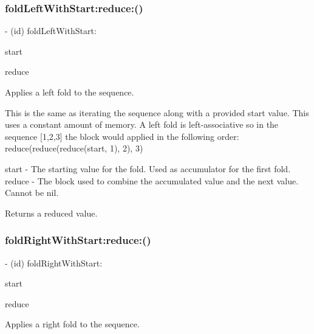 \subsubsection{\texorpdfstring{fold\+Left\+With\+Start\+:reduce\+:()}{foldLeftWithStart:reduce:()}\hspace{0.1cm}{\footnotesize\ttfamily [3/3]}}
{\footnotesize\ttfamily -\/ (id) fold\+Left\+With\+Start\+: \begin{DoxyParamCaption}\item[{(id)}]{start }\item[{reduce:(id($^\wedge$)(id accumulator, id value))}]{reduce }\end{DoxyParamCaption}}

Applies a left fold to the sequence.

This is the same as iterating the sequence along with a provided start value. This uses a constant amount of memory. A left fold is left-\/associative so in the sequence \mbox{[}1,2,3\mbox{]} the block would applied in the following order\+: reduce(reduce(reduce(start, 1), 2), 3)

start -\/ The starting value for the fold. Used as {\ttfamily accumulator} for the first fold. reduce -\/ The block used to combine the accumulated value and the next value. Cannot be nil.

Returns a reduced value. \mbox{\label{interface_r_a_c_sequence_abc932140e0279336ed6829b6f91b577e}} 
\subsubsection{\texorpdfstring{fold\+Right\+With\+Start\+:reduce\+:()}{foldRightWithStart:reduce:()}\hspace{0.1cm}{\footnotesize\ttfamily [1/3]}}
{\footnotesize\ttfamily -\/ (id) fold\+Right\+With\+Start\+: \begin{DoxyParamCaption}\item[{(id)}]{start }\item[{reduce:(id($^\wedge$)(id first, \mbox{\hyperlink{interface_r_a_c_sequence}{R\+A\+C\+Sequence}} $\ast$rest))}]{reduce }\end{DoxyParamCaption}}

Applies a right fold to the sequence.

